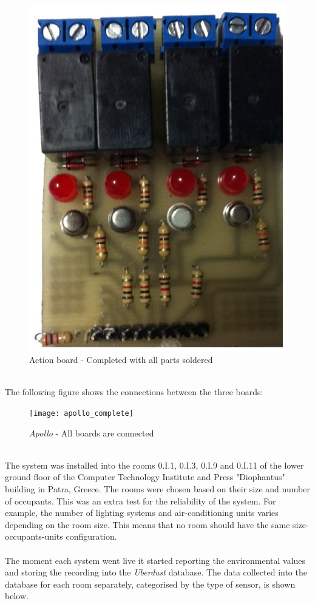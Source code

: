 \documentclass[12pt,a4paper,draft]{report}
\begin{document}
\begin{figure}[H]
\centering
	\includegraphics*[scale=0.3]{action_brd_complete}
	\caption{Action board - Completed with all parts soldered}
	\label{Action_brd_complete}
\end{figure}
\ \\
%
The following figure shows the connections between the three boards:
\ \\
\begin{figure}[H]
\centering
	\texttt{[image: apollo\_complete]}
	\caption{\emph{Apollo} - All boards are connected}
	\label{all_brd_connected}
\end{figure}
\ \\
%
The system was installed into the rooms 0.I.1, 0.I.3, 0.I.9 and 0.I.11 of the lower ground floor of the Computer Technology Institute and Press "Diophantus" building in Patra, Greece.
The rooms were chosen based on their size and number of occupants.
This was an extra test for the reliability of the system.
For example, the number of lighting systems and air-conditioning units varies depending on the room size.
This means that no room should have the same size-occupants-units configuration. \\
\ \\
The moment each system went live it started reporting the environmental values and storing the recording into the \textit{Uberdust} database.
The data collected into the database for each room separately, categorised by the type of sensor, is shown below.\\
\ \\
%
\end{document}
